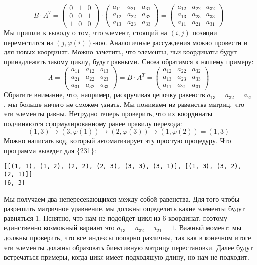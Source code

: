 \documentclass[a4paper,12pt]{article}
\begin{document}
\[ B \cdot A^T = \begin{pmatrix}
0 & 1 & 0 \\
0 & 0 & 1 \\
1 & 0 & 0 
\end{pmatrix} \cdot \begin{pmatrix}
a_{11} & a_{21} & a_{31} \\
a_{12} & a_{22} & a_{32} \\
a_{13} & a_{23} & a_{33} 
\end{pmatrix} = \begin{pmatrix}
a_{12} & a_{22} & a_{32} \\
a_{13} & a_{23} & a_{33} \\
a_{11} & a_{21} & a_{31} 
\end{pmatrix}\]
Мы пришли к выводу о том, что элемент, стоящий на $(i, j)$ позиции переместится на $(j, \varphi(i))$-юю. Аналогичные рассуждения можно провести и для новых координат. Можно заметить, что элементы, чьи координаты будут принадлежать такому циклу, будут равными. Снова обратимся к нашему примеру:
\[A = \begin{pmatrix}
a_{11} & a_{12} & a_{13} \\
a_{21} & a_{22} & a_{23} \\
a_{31} & a_{32} & a_{33} 
\end{pmatrix} = B \cdot A^T = \begin{pmatrix}
a_{12} & a_{22} & a_{32} \\
a_{13} & a_{23} & a_{33} \\
a_{11} & a_{21} & a_{31} 
\end{pmatrix}\]
Обратите внимание, что, например, раскручивая цепочку равенств $a_{13} = a_{32} = a_{21}$, мы больше ничего не сможем узнать. Мы понимаем из равенства матриц, что эти элементы равны. Нетрудно теперь проверить, что их координаты подчиняются сформулированному ранее правилу перехода:
\[(1, 3) \longrightarrow (3, \varphi(1)) \longrightarrow (2, \varphi(3)) \longrightarrow (1, \varphi(2)) = (1, 3)\]
Можно написать код, который автоматизирует эту простую процедуру. Что программа выведет для \{231\}:
\begin{lstlisting}
[[(1, 1), (1, 2), (2, 2), (2, 3), (3, 3), (3, 1)], [(1, 3), (3, 2), (2, 1)]]
[6, 3]
\end{lstlisting}
Мы получаем два непересекающихся между собой равенства. Для того чтобы разрешить матричное уравнение, мы должны определить какие элементы будут равняться 1. Понятно, что нам не подойдет цикл из 6 координат, поэтому единственно возможный вариант это $a_{13} = a_{32} = a_{21} = 1.$ Важный момент: мы должны проверить, что все индексы попарно различны, так как в конечном итоге эти элементы должны образовать биективную матрицу перестановки. Далее будут встречаться примеры, когда цикл имеет подходящую длину, но нам не подходит. \\
\end{document}
